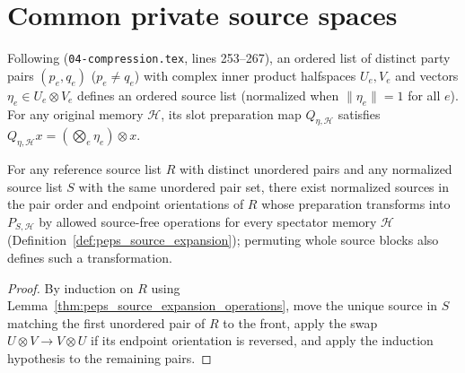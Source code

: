 \section{Common private source spaces}
\label{sec:peps_common_source_spaces}

\begin{definition}
    \label{def:peps_source_slots}
    \leanok
    Following \cite[proof of Theorem~5.2]{OpenAI2026PolynomialPEPS}
    (\texttt{04-compression.tex}, lines 253--267), an ordered list of distinct
    party pairs $(p_e,q_e)$ ($p_e\ne q_e$) with complex inner product halfspaces
    $U_e,V_e$ and vectors $\eta_e\in U_e\otimes V_e$ defines an ordered source
    list (normalized when $\|\eta_e\|=1$ for all $e$). For any original memory
    $\mathcal H$, its slot preparation map $Q_{\eta,\mathcal H}$ satisfies
    $Q_{\eta,\mathcal H}x=(\bigotimes_e\eta_e)\otimes x$.
\end{definition}

\begin{lemma}
    \label{thm:peps_source_ordering}
    \leanok
    For any reference source list $R$ with distinct unordered pairs and any
    normalized source list $S$ with the same unordered pair set, there exist
    normalized sources in the pair order and endpoint orientations of $R$ whose
    preparation transforms into $P_{S,\mathcal H}$ by allowed source-free
    operations for every spectator memory $\mathcal H$
    (Definition~\ref{def:peps_source_expansion}); permuting whole source blocks
    also defines such a transformation.
\end{lemma}

\begin{proof}\leanok
    By induction on $R$ using Lemma~\ref{thm:peps_source_expansion_operations},
    move the unique source in $S$ matching the first unordered pair of $R$ to
    the front, apply the swap $U\otimes V\to V\otimes U$ if its endpoint
    orientation is reversed, and apply the induction hypothesis to the remaining
    pairs.
\end{proof}

